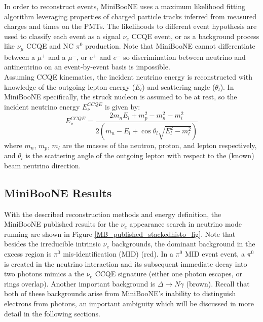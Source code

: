 In order to reconstruct events, MiniBooNE uses a maximum likelihood fitting algorithm leveraging properties of charged particle tracks inferred from measured charges and times on the PMTs. The likelihoods to different event hypothesis are used to classify each event as a signal $\nu_e$ CCQE event, or as a background process like $\nu_\mu$ CCQE and NC $\pi^0$ production. Note that MiniBooNE cannot differentiate between a $\mu^+$ and a $\mu^-$, or $e^+$ and $e^-$ so discrimination between neutrino and antineutrino on an event-by-event basis is impossible.\\

Assuming CCQE kinematics, the incident neutrino energy is reconstructed with knowledge of the outgoing lepton energy ($E_l$) and scattering angle ($\theta_l$). In MiniBooNE specifically, the struck nucleon is assumed to be at rest, so the incident neutrino energy $E_\nu^{CCQE}$ is given by:
\begin{equation}\label{MB_CCQE_formula}
E_\nu^{CCQE} = \frac{2m_nE_l+m_p^2-m_n^2-m_l^2}{2(m_n-E_l+\cos\theta_l\sqrt{E_l^2-m_l^2})}
\end{equation}
where $m_n$, $m_p$, $m_l$ are the masses of the neutron, proton, and lepton respectively, and $\theta_l$ is the scattering angle of the outgoing lepton with respect to the (known) beam neutrino direction.\\

\subsection{MiniBooNE Results}
With the described reconstruction methods and energy definition, the MiniBooNE published results \cite{MBLEEPaper} for the $\nu_e$ appearance search in neutrino mode running are shown in Figure \ref{MB_published_stackedhisto_fig}. Note that besides the irreducible intrinsic $\nu_e$ backgrounds, the dominant background in the excess region is $\pi^0$ mis-identification (MID) (red). In a $\pi^0$ MID event event, a $\pi^0$ is created in the neutrino interaction and its subsequent immediate decay into two photons mimics a the $\nu_e$ CCQE signature (either one photon escapes, or rings overlap). Another important background is $\Delta\rightarrow N\gamma$ (brown). Recall that both of these backgrounds arise from MiniBooNE's inability to distinguish electrons from photons, an important ambiguity which will be discussed in more detail in the following sections.\\


